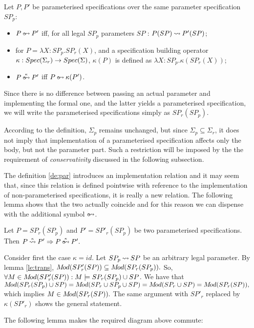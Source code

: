 \begin{DEFINITION}\label{de:par}
Let $P,P'$ be parameterised specifications over the same parameter specification $SP_p$: \begin{itemize}
\item $P\pim P'$ iff, for all legal $SP_p$ parameters $SP$ : $P(SP)\mathbin{\leadsto} P'(SP)$;
\item for $P = \lambda X:SP_p.SP_r(X)$, and a specification building operator $\kappa:Spec(\Sigma_r)\rightarrow Spec(\Sigma)$, $\kappa(P)$ is defined as $\lambda X:SP_p.\kappa(SP_r(X))$; \item $P\pimm{\kappa} P'$ iff $P\pim \kappa(P')$. \end{itemize}
\end{DEFINITION}
\noindent Since there is no difference between passing an actual parameter and
implementing the formal one, and the latter yields a parameterised specification, we will write the parameterised specifications simply as $SP_r(SP_p)$.

According to the definition, $\Sigma_p$ remains unchanged, but since $\Sigma_p\subseteq \Sigma_r$, it does not imply that implementation of a parameterised specification affects only the body, but not the parameter part. Such a restriction will be imposed by the the requirement of {\em conservativity} discussed in the following subsection.

The definition \ref{de:par} introduces an implementation relation and it may seem that,
since this relation is defined pointwise with reference to the implementation of non-parameterised specifications, it is really a new relation. The following lemma shows that the two actually coincide and for this reason we can dispense with the additional symbol $\pim$. 

\begin{LEMMA}\label{le:onlybody}
Let $P= SP_r(SP_p)$ and $P'=SP'_r(SP_p)$ be two parameterised specifications. Then $P\imm\kappa P' \impl P\pimm{\kappa} P'.$ \end{LEMMA}
\begin{PROOF}
Consider first the case $\kappa=id.$ Let $SP_p\mathbin{\leadsto} SP$ be an arbitrary legal parameter.
By lemma \ref{le:trans}, $M\!od(SP'_r(SP))\subseteq M\!od(SP_r(SP_p)).$ So, $\forall M\in M\!od(SP'_r(SP)):M\models SP_r(SP_p) \cup SP$. We have that
$M\!od(SP_r(SP_p)\cup SP)=M\!od(SP_r\cup SP_p\cup SP)=M\!od(SP_r\cup SP)= M\!od(SP_r(SP)),$
which implies $M\in M\!od(SP_r(SP)).$
The same argument with $SP'_r$ replaced by $\kappa(SP'_r)$ shows the general statement.
\end{PROOF}
The following lemma makes the required diagram above commute: 

